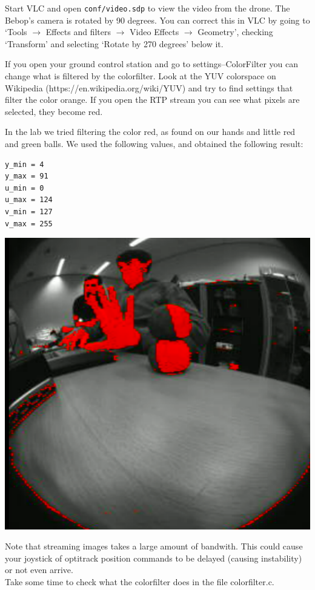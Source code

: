 \documentclass{article}
\begin{document}
Start VLC and open \verb|conf/video.sdp| to view the video from the drone.
The Bebop's camera is rotated by 90 degrees. You can correct this in VLC by going to `Tools $\rightarrow$ Effects and filters $\rightarrow$ Video Effects $\rightarrow$ Geometry', checking `Transform' and selecting `Rotate by 270 degrees' below it.
 
If you open your ground control station and go to settings--ColorFilter you can change what is filtered by the colorfilter. Look at the YUV colorspace on Wikipedia (https://en.wikipedia.org/wiki/YUV) and try to find settings that filter the color orange. If you open the RTP stream you can see what pixels are selected, they become red. 

In the lab we tried filtering the color red, as found on our hands and little red and green balls. We used the following values, and obtained the following result:
\begin{verbatim}
y_min = 4
y_max = 91
u_min = 0
u_max = 124
v_min = 127
v_max = 255
\end{verbatim}
\includegraphics[width=0.8\linewidth]{filtered}

Note that streaming images takes a large amount of bandwith. This could cause your joystick of optitrack position commands to be delayed (causing instability) or not even arrive.\\

\noindent Take some time to check what the colorfilter does in the file colorfilter.c. 
\end{document}
